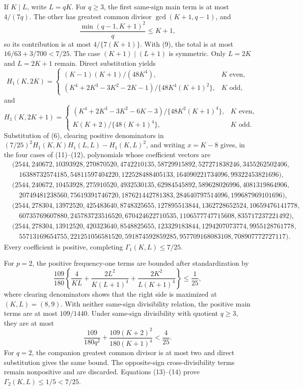 If \(K\mid L\), write \(L=qK\).  For \(q\geq3\), the first same-sign main term is at most \(4/(7q)\).  The other has greatest common divisor \(\gcd(K+1,q-1)\), and
\[
 \frac{\min(q-1,K+1)^2}{q}\leq K+1,
\]
so its contribution is at most \(4/\{7(K+1)\}\).  With (9), the total is at most \(16/63+3/700<7/25\).  The case \((K+1)\mid(L+1)\) is symmetric.  Only \(L=2K\) and \(L=2K+1\) remain.  Direct substitution yields
\[
 H_1(K,2K)=
 \begin{cases}
 (K-1)(K+1)/(48K^4),&K\text{ even},\\
 (K^4+2K^3-3K^2-2K-1)/\{48K^4(K+1)^2\},&K\text{ odd},
 \end{cases}                                                               \tag{11}
\]
and
\[
 H_1(K,2K+1)=
 \begin{cases}
 (K^4+2K^3-3K^2-6K-3)/\{48K^2(K+1)^4\},&K\text{ even},\\
 K(K+2)/\{48(K+1)^4\},&K\text{ odd}.
 \end{cases}                                                               \tag{12}
\]
Substitution of (6), clearing positive denominators in
\((7/25)^2H_1(K,K)H_1(L,L)-H_1(K,L)^2\), and writing \(x=K-8\) gives, in the four cases of (11)--(12), polynomials whose coefficient vectors are
\[
\begin{split}
 &(2544,240672,10393928,270870520,4742210135,58729915892,527271838246,3455262502406,\\
 &\quad16388732574185,54811597404220,122528488405133,164090221734096,99322453821696),\\
 &(2544,240672,10453928,275910520,4932530135,62984545892,589628026996,4081319864906,\\
 &\quad20749481238560,75619391746720,187621442781383,284640797514096,199687969101696),\\
 &(2544,278304,13972520,425483640,8748325655,127895513844,1362728652524,10659476141778,\\
 &\quad60735769607880,245783723516520,670424622710535,1106577747715608,835717237221492),\\
 &(2544,278304,13912520,420323640,8548825655,123329183844,1294207073774,9955128761778,\\
 &\quad55713169654755,221251056581520,591874592859285,957709168083108,708907772727117).
\end{split}
\]
Every coefficient is positive, completing \(\Gamma_1(K,L)\leq7/25\).

For \(p=2\), the positive frequency-one terms are bounded after standardization by
\[
 \frac{109}{180}\left\{\frac4{KL}
 +\frac{2L^2}{K(L+1)^4}+\frac{2K^2}{L(K+1)^4}\right\}\leq\frac1{25},    \tag{13}
\]
where clearing denominators shows that the right side is maximized at \((K,L)=(8,9)\).  With neither same-sign divisibility relation, the positive main terms are at most \(109/1440\).  Under same-sign divisibility with quotient \(q\geq3\), they are at most
\[
 \frac{109}{180q^2}+\frac{109(K+2)^2}{180(K+1)^4}<\frac4{25}.            \tag{14}
\]
For \(q=2\), the companion greatest common divisor is at most two and direct substitution gives the same bound.  The opposite-sign cross-divisibility terms remain nonpositive and are discarded.  Equations (13)--(14) prove \(\Gamma_2(K,L)\leq1/5<7/25\).

